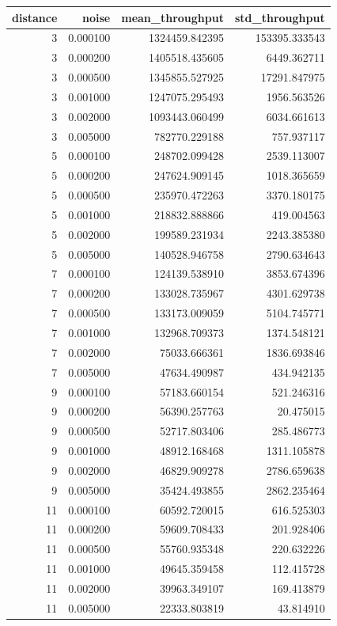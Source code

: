 \begin{tabular}{rrrr}
\toprule
distance & noise & mean_throughput & std_throughput \\
\midrule
3 & 0.000100 & 1324459.842395 & 153395.333543 \\
3 & 0.000200 & 1405518.435605 & 6449.362711 \\
3 & 0.000500 & 1345855.527925 & 17291.847975 \\
3 & 0.001000 & 1247075.295493 & 1956.563526 \\
3 & 0.002000 & 1093443.060499 & 6034.661613 \\
3 & 0.005000 & 782770.229188 & 757.937117 \\
5 & 0.000100 & 248702.099428 & 2539.113007 \\
5 & 0.000200 & 247624.909145 & 1018.365659 \\
5 & 0.000500 & 235970.472263 & 3370.180175 \\
5 & 0.001000 & 218832.888866 & 419.004563 \\
5 & 0.002000 & 199589.231934 & 2243.385380 \\
5 & 0.005000 & 140528.946758 & 2790.634643 \\
7 & 0.000100 & 124139.538910 & 3853.674396 \\
7 & 0.000200 & 133028.735967 & 4301.629738 \\
7 & 0.000500 & 133173.009059 & 5104.745771 \\
7 & 0.001000 & 132968.709373 & 1374.548121 \\
7 & 0.002000 & 75033.666361 & 1836.693846 \\
7 & 0.005000 & 47634.490987 & 434.942135 \\
9 & 0.000100 & 57183.660154 & 521.246316 \\
9 & 0.000200 & 56390.257763 & 20.475015 \\
9 & 0.000500 & 52717.803406 & 285.486773 \\
9 & 0.001000 & 48912.168468 & 1311.105878 \\
9 & 0.002000 & 46829.909278 & 2786.659638 \\
9 & 0.005000 & 35424.493855 & 2862.235464 \\
11 & 0.000100 & 60592.720015 & 616.525303 \\
11 & 0.000200 & 59609.708433 & 201.928406 \\
11 & 0.000500 & 55760.935348 & 220.632226 \\
11 & 0.001000 & 49645.359458 & 112.415728 \\
11 & 0.002000 & 39963.349107 & 169.413879 \\
11 & 0.005000 & 22333.803819 & 43.814910 \\
\bottomrule
\end{tabular}
